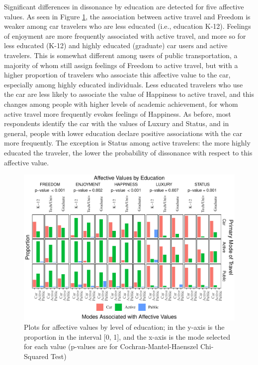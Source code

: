 \documentclass[]{elsarticle} %
\makeatletter
\def\maxwidth{\ifdim\Gin@nat@width>\linewidth\linewidth
\else\Gin@nat@width\fi}
\let\Oldincludegraphics\includegraphics
\renewcommand{\includegraphics}[1]{\Oldincludegraphics[width=\maxwidth]{#1}}
\makeatother
\begin{document}
Significant differences in dissonance by education are detected for five
affective values. As seen in Figure \ref{fig:bar-plots-by-education},
the association between active travel and Freedom is weaker among car
travelers who are less educated (i.e., education K-12). Feelings of
enjoyment are more frequently associated with active travel, and more so
for less educated (K-12) and highly educated (graduate) car users and
active travelers. This is somewhat different among users of public
transportation, a majority of whom still assign feelings of Freedom to
active travel, but with a higher proportion of travelers who associate
this affective value to the car, especially among highly educated
individuals. Less educated travelers who use the car are less likely to
associate the value of Happiness to active travel, and this changes
among people with higher levels of academic achievement, for whom active
travel more frequently evokes feelings of Happiness. As before, most
respondents identify the car with the values of Luxury and Status, and
in general, people with lower education declare positive associations
with the car more frequently. The exception is Status among active
travelers: the more highly educated the traveler, the lower the
probability of dissonance with respect to this affective value.

\begin{figure}
\centering
\includegraphics{Dissonance_Santiago_v2_files/figure-latex/figure-bar-plots-by-attribute-and-education-1.pdf}
\caption{\label{fig:bar-plots-by-education}Plots for affective values by
level of education; in the y-axis is the proportion in the interval
{[}0, 1{]}, and the x-axis is the mode selected for each value (p-values
are for Cochran-Mantel-Haenszel Chi-Squared Test)}
\end{figure}
\end{document}
